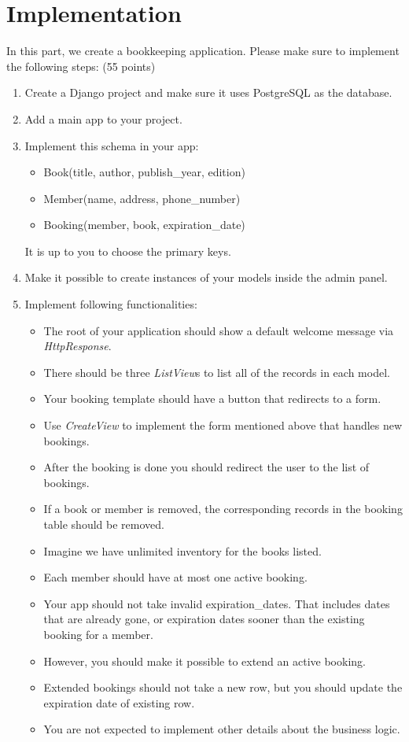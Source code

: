 \documentclass{homework}
\begin{document}
\section*{Implementation}
In this part, we create a bookkeeping application. Please make sure to implement the following steps: (55 points)
\begin{enumerate}[label=\roman*.]
    \item Create a Django project and make sure it uses PostgreSQL as the database.
    \item Add a main app to your project.
    \item Implement this schema in your app:
    \begin{itemize}
        \item Book(title, author, publish\_year, edition)
        \item Member(name, address, phone\_number)
        \item Booking(member, book, expiration\_date)
    \end{itemize}
    It is up to you to choose the primary keys.
    \item Make it possible to create instances of your models inside the admin panel.
    \item Implement following functionalities:
    \begin{itemize}
        \item The root of your application should show a default welcome message via \textit{HttpResponse}.
        \item There should be three \textit{ListView}s to list all of the records in each model.
        \item Your booking template should have a button that redirects to a form.
        \item Use \textit{CreateView} to implement the form mentioned above that handles new bookings.
        \item After the booking is done you should redirect the user to the list of bookings.
        \item If a book or member is removed, the corresponding records in the booking table should be removed.
        \item Imagine we have unlimited inventory for the books listed.
        \item Each member should have at most one active booking.
        \item Your app should not take invalid expiration\_dates. That includes dates that are already gone, or expiration dates sooner than the existing booking for a member.
        \item However, you should make it possible to extend an active booking.
        \item Extended bookings should not take a new row, but you should update the expiration date of existing row.
        \item You are not expected to implement other details about the business logic.
    \end{itemize}
\end{enumerate}
\newpage
\end{document}
